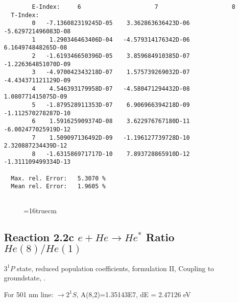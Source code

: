 \documentclass[12pt,dvipdfmx]{article}
\begin{document}
\begin{small}
\begin{verbatim}
        E-Index:     6                     7                     8
  T-Index:
        0   -7.136082319245D-05    3.362863636423D-06   -5.629721496083D-08
        1    1.290346463406D-04   -4.579314176342D-06    6.164974848265D-08
        2   -1.619346650396D-05    3.859684910385D-07   -1.226364851070D-09
        3   -4.970042343218D-07    1.575739269032D-07   -4.434371121129D-09
        4    4.546393179958D-07   -4.580471294432D-08    1.080771415075D-09
        5   -1.879528911353D-07    6.906966394218D-09   -1.112570278287D-10
        6    1.591625909374D-08    3.622976767180D-11   -6.002477025919D-12
        7    1.509097136492D-09   -1.196127739728D-10    2.320887234439D-12
        8   -1.631586971717D-10    7.893728865910D-12   -1.311109499334D-13

  Max. rel. Error:   5.3070 %
  Mean rel. Error:   1.9605 %


\end{verbatim}\end{small}
\begin{figure} \label{2.2b}
\epsfxsize=16truecm
\end{figure}
\newpage


\subsection{
  Reaction 2.2c $e + He \rightarrow He^*  $ Ratio $He(8)/He(1)$
}

  $3^1P$ state,
  reduced population coefficients, formulation II,
  Coupling to groundstate, \cite{kn:Fujimoto}.

  For 501 nm line: $\rightarrow 2^1S$, A(8,2)=1.35143E7, dE = 2.47126 eV
\end{document}
